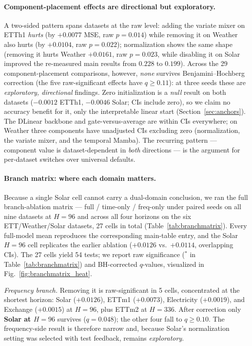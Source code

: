 \documentclass[review,12pt]{elsarticle}
\begin{document}
\paragraph{Component-placement effects are directional but exploratory.} A
two-sided pattern spans datasets at the raw level: adding the variate mixer
on ETTh1 \emph{hurts} (by $+0.0077$ MSE, raw $p{=}0.014$) while removing it
on Weather also hurts (by $+0.0104$, raw $p{=}0.022$); normalization shows the
same shape (removing it hurts Weather $+0.0161$, raw $p{=}0.023$, while
disabling it on Solar improved the re-measured main results from $0.228$ to
$0.199$). Across the 29 component-placement comparisons, however,
\emph{none} survives Benjamini--Hochberg correction (the five raw-significant
effects have $q\ge 0.11$): at three seeds these are \emph{exploratory,
directional} findings. Zero initialization is a \emph{null} result on both
datasets ($-0.0012$ ETTh1, $-0.0046$ Solar; CIs include zero), so we claim no
accuracy benefit for it, only the interpretable linear start
(Section~\ref{sec:anchors}). The DLinear backbone and gate-versus-average are
within CIs everywhere; on Weather three components have unadjusted CIs
excluding zero (normalization, the variate mixer, and the temporal Mamba).
The recurring pattern --- component value is dataset-dependent in \emph{both}
directions --- is the argument for per-dataset switches over universal
defaults.

\paragraph{Branch matrix: where each domain matters.} Because a single
Solar cell cannot carry a dual-domain conclusion, we ran the full
branch-ablation matrix --- full / time-only / freq-only under paired seeds
on all nine datasets at $H{=}96$ and across all four horizons on the six
ETT/Weather/Solar datasets, 27 cells in total
(Table~\ref{tab:branchmatrix}). Every full-model mean reproduces the
corresponding main-table entry, and the Solar $H{=}96$ cell replicates the
earlier ablation ($+0.0126$ vs.\ $+0.0114$, overlapping CIs). The 27 cells
yield 54 tests; we report raw significance ($^{*}$ in
Table~\ref{tab:branchmatrix}) and BH-corrected $q$-values, visualized in
Fig.~\ref{fig:branchmatrix_heat}.

\emph{Frequency branch.} Removing it is raw-significant in 5 cells,
concentrated at the shortest horizon: Solar ($+0.0126$), ETTm1 ($+0.0073$),
Electricity ($+0.0019$), and Exchange ($+0.0015$) at $H{=}96$, plus ETTm2 at
$H{=}336$. After correction only \textbf{Solar at $H{=}96$} survives
($q{=}0.048$); the other four fall to $q\ge 0.10$. The frequency-side result
is therefore narrow and, because Solar's normalization setting was selected
with test feedback, remains \emph{exploratory}.
\end{document}
